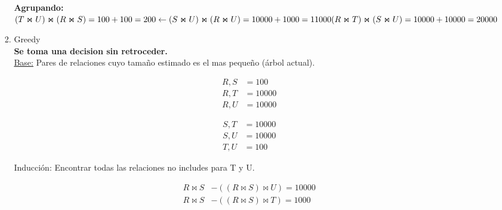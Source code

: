\documentclass{templateNote}
\begin{document}
\begin{enumerate}
\begin{enumerate}[label=\alph*)]
\begin{enumerate}[label=\alph*)]
                \noindent \textbf{Agrupando:} \\
                \begin{math}
                    (T \Join U) \Join (R \Join S) = 100 + 100 = 200 \leftarrow\\
                    (S \Join U) \Join (R \Join U) = 10000 + 1000 = 11000 \\
                    (R \Join T) \Join (S \Join U) = 10000 + 10000 = 20000 \\
                \end{math}

            \newpage
            \item Greedy\\
            \noindent \textbf{Se toma una decision sin retroceder.} \\
            \noindent \underline{Base:} Pares de relaciones cuyo tamaño estimado es el mas pequeño (árbol actual).\\

            \noindent %
            \begin{center}
            \begin{minipage}{0.3\textwidth}
            \begin{align}
                {R,S} &= 100 \\
                {R,T} &= 10000 \nonumber \\
                {R,U} &= 10000 \nonumber 
            \end{align}
            \end{minipage}%
            \begin{minipage}{0.3\textwidth}
            \begin{align}
                {S,T} &= 10000 \nonumber \\
                {S,U} &= 10000 \nonumber \\  
                {T,U} &= 100 
            \end{align}
            \end{minipage}   
            \end{center}

            \vspace{0.5cm}
            \noindent Inducción: Encontrar todas las relaciones no includes para T y U.

            \begin{align*}
                R \Join S &- ((R \Join S) \Join U) = 10000 \\
                R \Join S &- ((R \Join S) \Join T) = 1000 \\
            \end{align*}
            

\end{enumerate}
\end{enumerate}
\end{enumerate}
\end{document}
